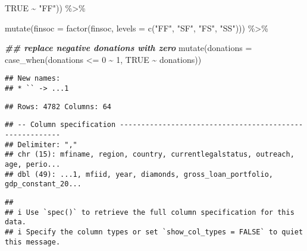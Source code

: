 \documentclass[a4paper,nobind]{templates/ociamthesis}
\newenvironment{Shaded}{\begin{snugshade}}{\end{snugshade}}
\newcommand{\AttributeTok}[1]{\textcolor[rgb]{0.77,0.63,0.00}{#1}}
\newcommand{\ConstantTok}[1]{\textcolor[rgb]{0.00,0.00,0.00}{#1}}
\newcommand{\DecValTok}[1]{\textcolor[rgb]{0.00,0.00,0.81}{#1}}
\newcommand{\DocumentationTok}[1]{\textcolor[rgb]{0.56,0.35,0.01}{\textbf{\textit{#1}}}}
\newcommand{\FunctionTok}[1]{\textcolor[rgb]{0.00,0.00,0.00}{#1}}
\newcommand{\NormalTok}[1]{#1}
\newcommand{\SpecialCharTok}[1]{\textcolor[rgb]{0.00,0.00,0.00}{#1}}
\newcommand{\StringTok}[1]{\textcolor[rgb]{0.31,0.60,0.02}{#1}}
\renewenvironment{Shaded}
{
  \vspace{10pt}%
  \begin{snugshade}%
}{%
  \end{snugshade}%
  \vspace{8pt}%
}
\begin{document}
\begin{Shaded}
\begin{Highlighting}[]
                            \ConstantTok{TRUE} \SpecialCharTok{\textasciitilde{}} \StringTok{"FF"}\NormalTok{)) }\SpecialCharTok{\%\textgreater{}\%} 
  
\FunctionTok{mutate}\NormalTok{(}\AttributeTok{finsoc =} \FunctionTok{factor}\NormalTok{(finsoc, }\AttributeTok{levels =} \FunctionTok{c}\NormalTok{(}\StringTok{"FF"}\NormalTok{, }\StringTok{"SF"}\NormalTok{, }\StringTok{"FS"}\NormalTok{, }\StringTok{"SS"}\NormalTok{))) }\SpecialCharTok{\%\textgreater{}\%} 
  
\DocumentationTok{\#\# replace negative donations with zero}
\FunctionTok{mutate}\NormalTok{(}\AttributeTok{donations =} \FunctionTok{case\_when}\NormalTok{(donations }\SpecialCharTok{\textless{}=} \DecValTok{0} \SpecialCharTok{\textasciitilde{}} \DecValTok{1}\NormalTok{,}
                             \ConstantTok{TRUE} \SpecialCharTok{\textasciitilde{}}\NormalTok{ donations))}
\end{Highlighting}
\end{Shaded}

\begin{verbatim}
## New names:
## * `` -> ...1
\end{verbatim}

\begin{verbatim}
## Rows: 4782 Columns: 64
\end{verbatim}

\begin{verbatim}
## -- Column specification --------------------------------------------------------
## Delimiter: ","
## chr (15): mfiname, region, country, currentlegalstatus, outreach, age, perio...
## dbl (49): ...1, mfiid, year, diamonds, gross_loan_portfolio, gdp_constant_20...
\end{verbatim}

\begin{verbatim}
## 
## i Use `spec()` to retrieve the full column specification for this data.
## i Specify the column types or set `show_col_types = FALSE` to quiet this message.
\end{verbatim}
\end{document}
